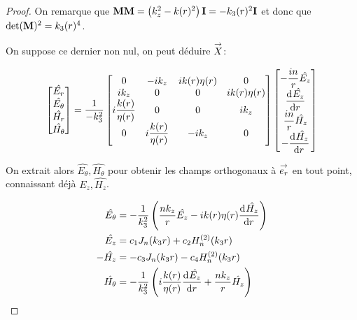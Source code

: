 \begin{proof}
      On remarque que \(\mM\mM = \left(k_z^2 - k(r)^2\right)\mI=-k_3(r)^2\mI\) et donc que \(\det(\mat{M})^2 = k_3(r)^4\).


      On suppose ce dernier non nul, on peut déduire \(\vect{X}\):

      \begin{equation*}
        \begin{bmatrix}
          \hat{E_r}\\
          \hat{E_\theta}\\
          \hat{H_r}\\
          \hat{H_\theta}
        \end{bmatrix} =
        \frac{1}{-k_3^2}
        \begin{bmatrix}
        0 & -ik_z & ik(r)\eta(r) & 0
        \\
        ik_z & 0 & 0 & ik(r)\eta(r)
        \\
        i\frac{k(r)}{\eta(r)} & 0 & 0 & ik_z
        \\
        0 & i\frac{k(r)}{\eta(r)} & -ik_z & 0
        \end{bmatrix}
        \begin{bmatrix}
          -\frac{in}{r}\hat{E_z}\\
          \ddp{r}{\hat{E_z}}\\
          \frac{in}{r}\hat{H_z}\\
          -\ddp{r}{\hat{H_z}}
        \end{bmatrix}
      \end{equation*}

      On extrait alors \(\hat{E_\theta}, \hat{H_\theta}\) pour obtenir les champs orthogonaux à \(\vect{e_r}\) en tout point, connaissant déjà \(\hat{E_z}, \hat{H_z}\).

      \begin{align*}
        \hat{E_\theta} &= -\frac{1}{k_3^2}\left(\frac{nk_z}{r}\hat{E_z} - ik(r)\eta(r)\ddp{r}{\hat{H_z}}\right)
        \\
        \hat{E_z} &= c_1 J_n(k_3 r) + c_2 H_n^{(2)}(k_3 r)
        \\
        -\hat{H_z} &= -c_3 J_n(k_3 r) - c_4 H_n^{(2)}(k_3 r)
        \\
        \hat{H_\theta} &= -\frac{1}{k_3^2}\left(i\frac{k(r)}{\eta(r)}\ddp{r}{\hat{E_z}} + \frac{nk_z}{r}\hat{H_z}\right)
      \end{align*}


\end{proof}
